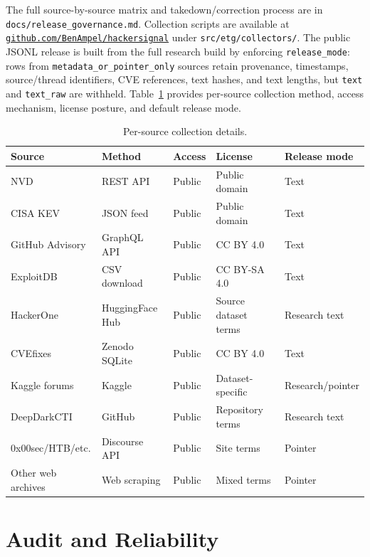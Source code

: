 \documentclass{article}
\begin{document}
The full source-by-source matrix and takedown/correction process are in \texttt{docs/release\_governance.md}. Collection scripts are available at \href{https://github.com/BenAmpel/hackersignal}{\texttt{github.com/BenAmpel/hackersignal}} under \texttt{src/etg/collectors/}. The public JSONL release is built from the full research build by enforcing \texttt{release\_mode}: rows from \texttt{metadata\_or\_pointer\_only} sources retain provenance, timestamps, source/thread identifiers, CVE references, text hashes, and text lengths, but \texttt{text} and \texttt{text\_raw} are withheld. Table~\ref{tab:collection-details} provides per-source collection method, access mechanism, license posture, and default release mode.

\begin{table}[t]
\centering
\small
\caption{Per-source collection details.}
\label{tab:collection-details}
\begin{tabular}{lllll}
\toprule
\textbf{Source} & \textbf{Method} & \textbf{Access} & \textbf{License} & \textbf{Release mode} \\
\midrule
NVD             & REST API        & Public & Public domain & Text \\
CISA KEV        & JSON feed       & Public & Public domain & Text \\
GitHub Advisory & GraphQL API     & Public & CC BY 4.0 & Text \\
ExploitDB       & CSV download    & Public & CC BY-SA 4.0 & Text \\
HackerOne       & HuggingFace Hub & Public & Source dataset terms & Research text \\
CVEfixes        & Zenodo SQLite   & Public & CC BY 4.0 & Text \\
Kaggle forums   & Kaggle          & Public & Dataset-specific & Research/pointer \\
DeepDarkCTI     & GitHub          & Public & Repository terms & Research text \\
0x00sec/HTB/etc.& Discourse API   & Public & Site terms & Pointer \\
Other web archives & Web scraping & Public & Mixed terms & Pointer \\
\bottomrule
\end{tabular}
\end{table}

\section{Audit and Reliability}
\label{app:audit-reliability}
\end{document}
